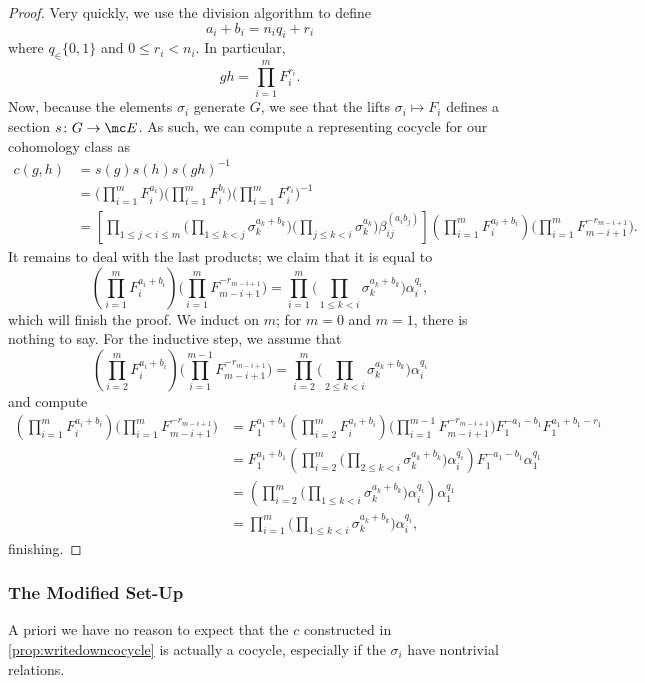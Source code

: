 \documentclass{article}
\numberwithin{equation}{section}
\begin{document}
\begin{proof}
	Very quickly, we use the division algorithm to define
	\[a_i+b_i=n_iq_i+r_i\]
	where $q_\in\{0,1\}$ and $0\le r_i<n_i$. In particular,
	\[gh=\prod_{i=1}^mF_i^{r_i}.\]
	Now, because the elements $\sigma_i$ generate $ G$, we see that the lifts $\sigma_i\mapsto F_i$ defines a section $s\colon G\to\mc E$. As such, we can compute a representing cocycle for our cohomology class as
	\begin{align*}
		c(g,h) &= s(g)s(h)s(gh)^{-1} \\
		&= \Bigg(\prod_{i=1}^mF_i^{a_i}\Bigg)\Bigg(\prod_{i=1}^mF_i^{b_i}\Bigg)\Bigg(\prod_{i=1}^mF_i^{r_i}\Bigg)^{-1} \\
		&= \left[\prod_{1\le j<i\le m}\Bigg(\prod_{1\le k<j}\sigma_k^{a_k+b_k}\Bigg)\Bigg(\prod_{j\le k<i}\sigma_k^{a_k}\Bigg)\beta_{ij}^{(a_ib_j)}\right]\left(\prod_{i=1}^mF_i^{a_i+b_i}\right)\Bigg(\prod_{i=1}^mF_{m-i+1}^{-r_{m-i+1}}\Bigg).
	\end{align*}
	It remains to deal with the last products; we claim that it is equal to
	\[\left(\prod_{i=1}^mF_i^{a_i+b_i}\right)\Bigg(\prod_{i=1}^mF_{m-i+1}^{-r_{m-i+1}}\Bigg)=\prod_{i=1}^m\Bigg(\prod_{1\le k<i}\sigma_k^{a_k+b_k}\Bigg)\alpha_i^{q_i},\]
	which will finish the proof. We induct on $m$; for $m=0$ and $m=1$, there is nothing to say. For the inductive step, we assume that
	\[\left(\prod_{i=2}^mF_i^{a_i+b_i}\right)\Bigg(\prod_{i=1}^{m-1}F_{m-i+1}^{-r_{m-i+1}}\Bigg)=\prod_{i=2}^m\Bigg(\prod_{2\le k<i}\sigma_k^{a_k+b_k}\Bigg)\alpha_i^{q_i}\]
	and compute
	\begin{align*}
		\left(\prod_{i=1}^mF_i^{a_i+b_i}\right)\Bigg(\prod_{i=1}^mF_{m-i+1}^{-r_{m-i+1}}\Bigg) &= F_1^{a_1+b_1}\left(\prod_{i=2}^mF_i^{a_i+b_i}\right)\Bigg(\prod_{i=1}^{m-1}F_{m-i+1}^{-r_{m-i+1}}\Bigg)F_1^{-a_1-b_1}F_1^{a_1+b_1-r_1} \\
		&= F_1^{a_1+b_1}\left(\prod_{i=2}^m\Bigg(\prod_{2\le k<i}\sigma_k^{a_k+b_k}\Bigg)\alpha_i^{q_i}\right)F_1^{-a_1-b_1}\alpha_1^{q_1} \\
		&= \left(\prod_{i=2}^m\Bigg(\prod_{1\le k<i}\sigma_k^{a_k+b_k}\Bigg)\alpha_i^{q_i}\right)\alpha_1^{q_1} \\
		&= \prod_{i=1}^m\Bigg(\prod_{1\le k<i}\sigma_k^{a_k+b_k}\Bigg)\alpha_i^{q_i},
	\end{align*}
	finishing.
\end{proof}

\subsubsection{The Modified Set-Up}
A priori we have no reason to expect that the $c$ constructed in \autoref{prop:writedowncocycle} is actually a cocycle, especially if the $\sigma_i$ have nontrivial relations.
\end{document}
